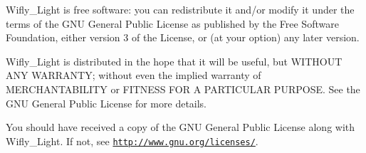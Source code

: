 Wifly\-\_\-\-Light is free software\-: you can redistribute it and/or modify it under the terms of the G\-N\-U General Public License as published by the Free Software Foundation, either version 3 of the License, or (at your option) any later version.

Wifly\-\_\-\-Light is distributed in the hope that it will be useful, but W\-I\-T\-H\-O\-U\-T A\-N\-Y W\-A\-R\-R\-A\-N\-T\-Y; without even the implied warranty of M\-E\-R\-C\-H\-A\-N\-T\-A\-B\-I\-L\-I\-T\-Y or F\-I\-T\-N\-E\-S\-S F\-O\-R A P\-A\-R\-T\-I\-C\-U\-L\-A\-R P\-U\-R\-P\-O\-S\-E. See the G\-N\-U General Public License for more details.

You should have received a copy of the G\-N\-U General Public License along with Wifly\-\_\-\-Light. If not, see \href{http://www.gnu.org/licenses/}{\tt http\-://www.\-gnu.\-org/licenses/}. 

